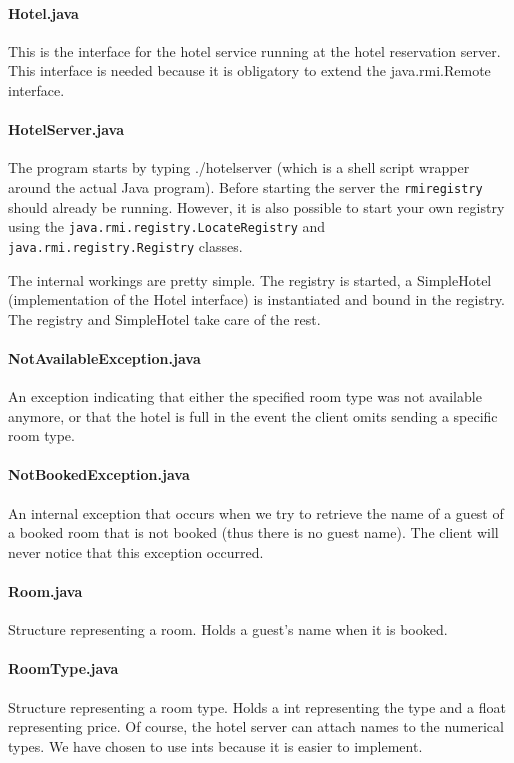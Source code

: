 \documentclass[a4paper,10pt]{article}
\begin{document}
\paragraph{Hotel.java}
This is the interface for the hotel service running at the hotel reservation server. This interface is needed because it is obligatory to extend the java.rmi.Remote interface.
 
\paragraph{HotelServer.java}
The program starts by typing ./hotelserver (which is a shell script wrapper around the actual Java program). Before starting the server the \texttt{rmiregistry} should already be running. However, it is also possible to start your own registry using the \texttt{java.rmi.registry.LocateRegistry} and \texttt{java.rmi.registry.Registry} classes.

The internal workings are pretty simple. The registry is started, a SimpleHotel (implementation of the Hotel interface) is instantiated and bound in the registry. The registry and SimpleHotel take care of the rest. 

\paragraph{NotAvailableException.java}
An exception indicating that either the specified room type was not available anymore, or that the hotel is full in the event the client omits sending a specific room type.

\paragraph{NotBookedException.java}
An internal exception that occurs when we try to retrieve the name of a guest of a booked room that is not booked (thus there is no guest name). The client will never notice that this exception occurred.

\paragraph{Room.java}
Structure representing a room. Holds a guest's name when it is booked.

\paragraph{RoomType.java}
Structure representing a room type. Holds a int representing the type and a float representing price. Of course, the hotel server can attach names to the numerical types. We have chosen to use ints because it is easier to implement.
\end{document}
